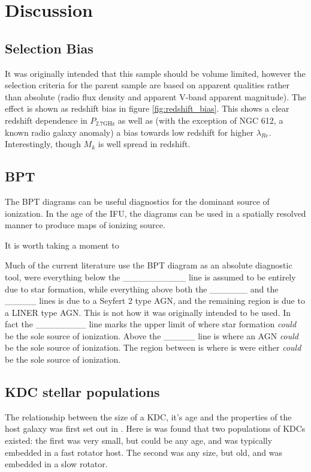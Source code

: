 \documentclass[fleqn,usenatbib,useAMS]{mnras}
\begin{document}
\section{Discussion}
	\label{sec:discuss}
	\subsection{Selection Bias}
	\label{subsec:bias}
	It was originally intended that this sample should be volume limited, however the selection criteria for the parent sample \citep{Ekers1989} are based on apparent qualities rather than absolute (radio flux density and apparent V-band apparent magnitude). The effect is shown as redshift bias in figure \ref{fig:redshift_bias}. This shows a clear redshift dependence in $P_\mathrm{2.7 GHz}$ as well as (with the exception of NGC 612, a known radio galaxy anomaly) a bias towards low redshift for higher $\lambda_{Re}$. Interestingly, though $M_k$ is well spread in redshift. 

	\subsection{BPT}
	\label{subsec:BPT}
	The BPT diagrams can be useful diagnostics for the dominant source of ionization. In the age of the IFU, the diagrams can be used in a spatially resolved manner to produce maps of ionizing source. 

	It is worth taking a moment to 

	Much of the current literature use the BPT diagram as an absolute diagnostic tool, were everything below the \_\_\_\_\_\_\_\_\_\_ line is assumed to be entirely due to star formation, while everything above both the \_\_\_\_\_\_ and the \_\_\_\_\_ lines is due to a Seyfert 2 type AGN, and the remaining region is due to a LINER type AGN. This is not how it was originally intended to be used. In fact the \_\_\_\_\_\_\_\_ line marks the upper limit of where star formation \textit{could} be the sole source of ionization. Above the \_\_\_\_\_ line is where an AGN \textit{could} be the sole source of ionization. The region between is where is were either \textit{could} be the sole source of ionization. 







	\subsection{KDC stellar populations}
	\label{subsec:KDCsize}
	The relationship between the size of a KDC, it's age and the properties of the host galaxy was first set out in \citet{McDermid2006}. Here is was found that two populations of KDCs existed: the first was very small, but could be any age, and was typically embedded in a fast rotator host. The second was any size, but old, and was embedded in a slow rotator.  
\end{document}
